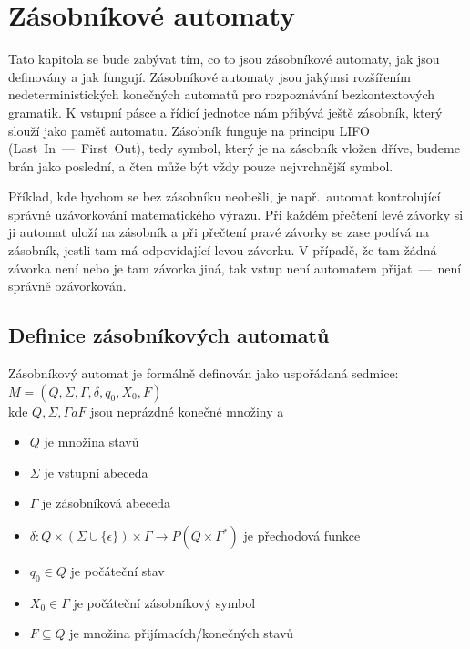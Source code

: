 \chapter{Zásobníkové automaty}

Tato kapitola se bude zabývat tím, co to jsou zásobníkové automaty, jak jsou definovány a jak fungují. Zásobníkové automaty jsou jakýmsi rozšířením nedeterministických konečných automatů pro rozpoznávání bezkontextových gramatik. K vstupní pásce a řídící jednotce nám přibývá ještě zásobník, který slouží jako paměť automatu. Zásobník funguje na principu LIFO (Last~In~---~First~Out), tedy symbol, který je na zásobník vložen dříve, budeme brán jako poslední, a čten může být vždy pouze nejvrchnější symbol.

Příklad, kde bychom se bez zásobníku neobešli, je např.~automat kontrolující správné uzávorkování matematického výrazu. Při každém přečtení levé závorky si ji automat uloží na zásobník a při přečtení pravé závorky se zase podívá na zásobník, jestli tam má odpovídající levou závorku. V případě, že tam žádná závorka není nebo je tam závorka jiná, tak vstup není automatem přijat~---~není správně ozávorkován.


\section{Definice zásobníkových automatů}\label{sec:DefinitonOfPDA}

Zásobníkový automat je formálně definován jako uspořádaná sedmice:\\
\indent\emph{$M = (Q, \Sigma, \Gamma, \delta, q_0, X_0, F)$}\\
kde $Q, \Sigma, \Gamma a F$ jsou neprázdné konečné množiny a 

\begin{itemize}
    \item $Q$ je množina stavů
    \item $\Sigma$ je vstupní abeceda
    \item $\Gamma$ je zásobníková abeceda
    \item $\delta : Q \times (\Sigma \cup \{\epsilon\}) \times \Gamma \rightarrow P(Q \times \Gamma^*)$ je přechodová funkce
    \item $q_0 \in Q$ je počáteční stav
    \item $X_0 \in \Gamma$ je počáteční zásobníkový symbol
    \item $F \subseteq Q$ je množina přijímacích/konečných stavů
\end{itemize}

